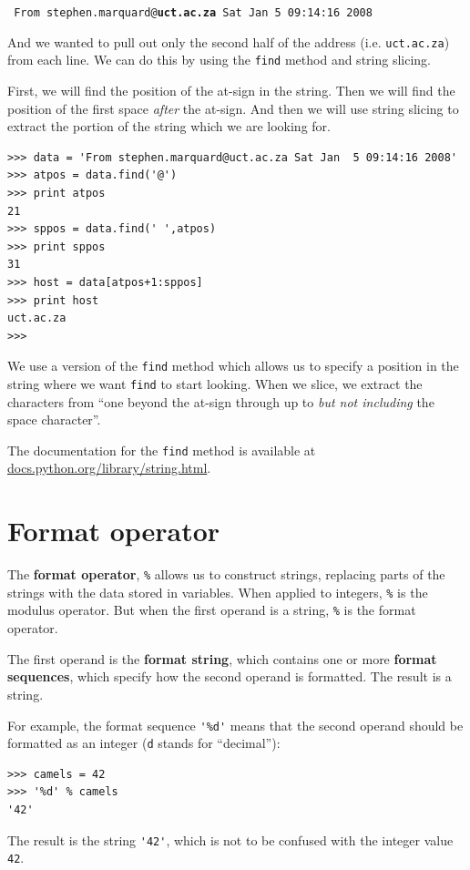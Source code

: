 \documentclass[10pt]{book}
\begin{document}
{\tt
From stephen.marquard@{\bf uct.ac.za} Sat Jan  5 09:14:16 2008
}

And we wanted to pull out only the second half of the address (i.e.
{\tt uct.ac.za}) from each line.  We can do this by using the {\tt find}
method and string slicing.   

First, we will find the position of the at-sign in the string.  Then we will
find the position of the first space \emph{after} the at-sign.  And then we
will use string slicing to extract the portion of the string which we 
are looking for.

\beforeverb
\begin{verbatim}
>>> data = 'From stephen.marquard@uct.ac.za Sat Jan  5 09:14:16 2008'
>>> atpos = data.find('@')
>>> print atpos
21
>>> sppos = data.find(' ',atpos)
>>> print sppos
31
>>> host = data[atpos+1:sppos]
>>> print host
uct.ac.za
>>> 
\end{verbatim}
\afterverb
%
We use a version of the {\tt find} method which allows us to specify
a position in the string where we want {\tt find} to start looking.
When we slice, we extract the characters 
from ``one beyond the at-sign through up to \emph{but not including} the 
space character''.  

The documentation for the {\tt find} method is available at
\url{docs.python.org/library/string.html}.

\section{Format operator}


The {\bf format operator}, {\tt \%}
allows us to construct strings, replacing parts of the strings
with the data stored in variables.
When applied to integers, {\tt \%} is the modulus operator.  But
when the first operand is a string, {\tt \%} is the format operator.


The first operand is the {\bf format string}, which contains
one or more {\bf format sequences}, which
specify how
the second operand is formatted.  The result is a string.


For example, the format sequence \verb"'%d'" means that
the second operand should be formatted as an
integer ({\tt d} stands for ``decimal''):

\beforeverb
\begin{verbatim}
>>> camels = 42
>>> '%d' % camels
'42'
\end{verbatim}
\afterverb
%
The result is the string \verb"'42'", which is not to be confused
with the integer value {\tt 42}.
\end{document}
